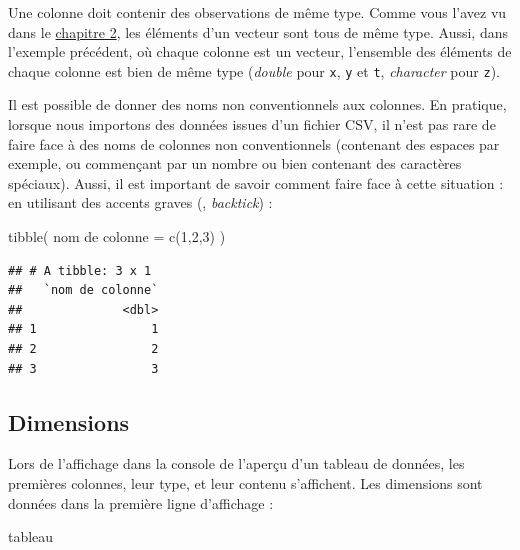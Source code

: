 \documentclass[
  11pt,
]{book}
\newenvironment{Shaded}{\begin{snugshade}}{\end{snugshade}}
\newcommand{\AttributeTok}[1]{\textcolor[rgb]{0.77,0.63,0.00}{#1}}
\newcommand{\DecValTok}[1]{\textcolor[rgb]{0.00,0.00,0.81}{#1}}
\newcommand{\FunctionTok}[1]{\textcolor[rgb]{0.00,0.00,0.00}{#1}}
\newcommand{\NormalTok}[1]{#1}
\newcommand{\OtherTok}[1]{\textcolor[rgb]{0.56,0.35,0.01}{#1}}
\newcommand{\StringTok}[1]{\textcolor[rgb]{0.31,0.60,0.02}{#1}}
\numberwithin{equation}{section}
\numberwithin{countremarque}{section}
\begin{document}
Une colonne doit contenir des observations de même type. Comme vous l'avez vu dans le \protect\hyperlink{type-des-donnuxe9es-et-premiuxe8re-structure}{chapitre 2}, les éléments d'un vecteur sont tous de même type. Aussi, dans l'exemple précédent, où chaque colonne est un vecteur, l'ensemble des éléments de chaque colonne est bien de même type (\emph{double} pour \texttt{x}, \texttt{y} et \texttt{t}, \emph{character} pour \texttt{z}).

Il est possible de donner des noms non conventionnels aux colonnes. En pratique, lorsque nous importons des données issues d'un fichier CSV, il n'est pas rare de faire face à des noms de colonnes non conventionnels (contenant des espaces par exemple, ou commençant par un nombre ou bien contenant des caractères spéciaux). Aussi, il est important de savoir comment faire face à cette situation : en utilisant des accents graves (\texttt{\textasciigrave{}}, \emph{backtick}) :

\begin{Shaded}
\begin{Highlighting}[]
\FunctionTok{tibble}\NormalTok{(}
  \StringTok{\textasciigrave{}}\AttributeTok{nom de colonne}\StringTok{\textasciigrave{}} \OtherTok{=} \FunctionTok{c}\NormalTok{(}\DecValTok{1}\NormalTok{,}\DecValTok{2}\NormalTok{,}\DecValTok{3}\NormalTok{)}
\NormalTok{)}
\end{Highlighting}
\end{Shaded}

\begin{lstlisting}
## # A tibble: 3 x 1
##   `nom de colonne`
##              <dbl>
## 1                1
## 2                2
## 3                3
\end{lstlisting}

\hypertarget{dimensions}{%
\subsection{Dimensions}\label{dimensions}}

Lors de l'affichage dans la console de l'aperçu d'un tableau de données, les premières colonnes, leur type, et leur contenu s'affichent. Les dimensions sont données dans la première ligne d'affichage :

\begin{Shaded}
\begin{Highlighting}[]
\NormalTok{tableau}
\end{Highlighting}
\end{Shaded}
\end{document}

